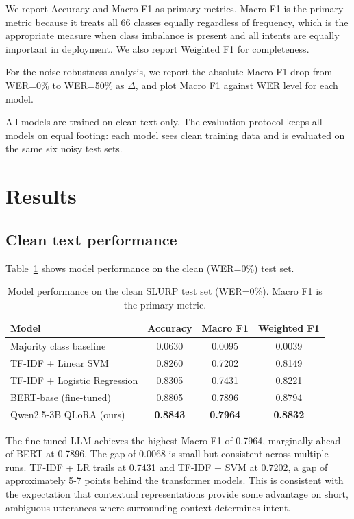 \documentclass[11pt,a4paper]{article}
\begin{document}
We report Accuracy and Macro F1 as primary metrics. Macro F1 is the primary metric because it treats all 66 classes equally regardless of frequency, which is the appropriate measure when class imbalance is present and all intents are equally important in deployment. We also report Weighted F1 for completeness.

For the noise robustness analysis, we report the absolute Macro F1 drop from WER=0\% to WER=50\% as $\Delta$, and plot Macro F1 against WER level for each model.

All models are trained on clean text only. The evaluation protocol keeps all models on equal footing: each model sees clean training data and is evaluated on the same six noisy test sets.

\section{Results}

\subsection{Clean text performance}

Table~\ref{tab:clean_results} shows model performance on the clean (WER=0\%) test set.

\begin{table}[H]
\centering
\caption{Model performance on the clean SLURP test set (WER=0\%). Macro F1 is the primary metric.}
\label{tab:clean_results}
\begin{tabular}{lccc}
\toprule
\textbf{Model} & \textbf{Accuracy} & \textbf{Macro F1} & \textbf{Weighted F1} \\
\midrule
Majority class baseline & 0.0630 & 0.0095 & 0.0039 \\
TF-IDF + Linear SVM & 0.8260 & 0.7202 & 0.8149 \\
TF-IDF + Logistic Regression & 0.8305 & 0.7431 & 0.8221 \\
BERT-base (fine-tuned) & 0.8805 & 0.7896 & 0.8794 \\
Qwen2.5-3B QLoRA (ours) & \textbf{0.8843} & \textbf{0.7964} & \textbf{0.8832} \\
\bottomrule
\end{tabular}
\end{table}

The fine-tuned LLM achieves the highest Macro F1 of 0.7964, marginally ahead of BERT at 0.7896. The gap of 0.0068 is small but consistent across multiple runs. TF-IDF + LR trails at 0.7431 and TF-IDF + SVM at 0.7202, a gap of approximately 5-7 points behind the transformer models. This is consistent with the expectation that contextual representations provide some advantage on short, ambiguous utterances where surrounding context determines intent.
\end{document}
